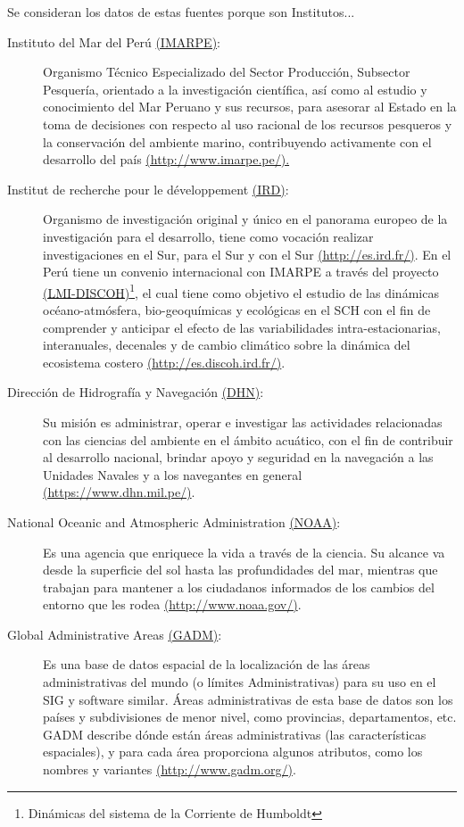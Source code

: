 Se consideran los datos de estas fuentes porque son Institutos...
\begin{description}
\item[Instituto del Mar del Perú \href{http://www.imarpe.pe/}{(IMARPE)}:]
Organismo Técnico Especializado del Sector Producción, Subsector Pesquería, orientado a la investigación científica, así como al estudio y conocimiento del Mar Peruano y sus recursos, para asesorar al Estado en la toma de decisiones con respecto al uso racional de los recursos pesqueros y la conservación del ambiente marino, contribuyendo activamente con el desarrollo del país \href{http://www.imarpe.pe/}{(http://www.imarpe.pe/).}
\item[Institut de recherche pour le développement \href{http://es.ird.fr/}{(IRD)}:]
Organismo de investigación original y único en el panorama europeo de la investigación para el desarrollo, tiene como vocación realizar investigaciones en el Sur, para el Sur y con el Sur \href{http://es.ird.fr/}{(http://es.ird.fr/)}. En el Perú tiene un convenio internacional con IMARPE a través del proyecto \href{http://es.discoh.ird.fr/}{(LMI-DISCOH)}\footnote{Dinámicas del sistema de la Corriente de Humboldt}, el cual tiene como objetivo el estudio de las dinámicas océano-atmósfera, bio-geoquímicas y ecológicas en el SCH con el fin de comprender y anticipar el efecto de las variabilidades intra-estacionarias, interanuales, decenales y de cambio climático sobre la dinámica del ecosistema costero \href{http://es.discoh.ird.fr/}{(http://es.discoh.ird.fr/)}.
\item[Dirección de Hidrografía y Navegación \href{https://www.dhn.mil.pe/}{(DHN)}:] 
Su misión es administrar, operar e investigar las actividades relacionadas con las ciencias del ambiente en el ámbito acuático, con el fin de contribuir al desarrollo nacional, brindar apoyo y seguridad en la navegación a las Unidades Navales y a los navegantes en general \href{https://www.dhn.mil.pe/}{(https://www.dhn.mil.pe/)}.
\item[National Oceanic and Atmospheric Administration \href{http://www.noaa.gov/}{(NOAA)}:] 
Es una agencia que enriquece la vida a través de la ciencia. Su alcance va desde la superficie del sol hasta las profundidades del mar, mientras que trabajan para mantener a los ciudadanos informados de los cambios del entorno que les rodea \href{http://www.noaa.gov/}{(http://www.noaa.gov/)}.
\item[Global Administrative Areas \href{http://www.gadm.org/}{(GADM)}:] 
Es una base de datos espacial de la localización de las áreas administrativas del mundo (o límites Administrativas) para su uso en el SIG y software similar. Áreas administrativas de esta base de datos son los países y subdivisiones de menor nivel, como provincias, departamentos, etc. GADM describe dónde están áreas administrativas (las características espaciales), y para cada área proporciona algunos atributos, como los nombres y variantes \href{http://www.gadm.org/}{(http://www.gadm.org/)}.


\end{description}
